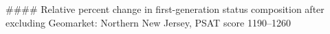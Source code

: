 #### Relative percent change in first-generation status composition after excluding Geomarket: Northern New Jersey, PSAT score 1190–1260
